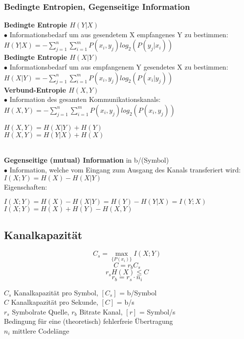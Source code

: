 \subsubsection{Bedingte Entropien, Gegenseitige Information}
	\textbf{Bedingte Entropie $H(Y|X)$}\\
	$\bullet$ Informationsbedarf um aus gesendetem X empfangenes Y zu bestimmen: $H(Y|X)	=- \sum\limits_{j=1}^{n} \sum\limits_{i=1}^{m} P(x_i,y_j) log_2(P(y_j|x_i))$ \\
	\textbf{Bedingte Entropie $H(X|Y)$}\\
	$\bullet$ Informationsbedarf um aus empfangenem Y gesendetes X zu bestimmen: $H(X|Y)	=- \sum\limits_{j=1}^{n} \sum\limits_{i=1}^{m} P(x_i,y_j) log_2(P(x_i|y_j))$ \\
	\textbf{Verbund-Entropie $H(X,Y)$} \\
	$\bullet$ Information des gesamten Kommunikationskanals:  $H(X,Y)	=- \sum\limits_{j=1}^{n} \sum\limits_{i=1}^{m} P(x_i,y_j) log_2(P(x_i,y_j))$ \qquad \parbox{6cm}{
		$H(X,Y) = H(X|Y) + H(Y)$ \\
		$H(X,Y) = H(Y|X) + H(X)$
	} \\
	\textbf{Gegenseitige (mutual) Information} in b/(Symbol)\\
	$\bullet$ Information, welche vom Eingang zum Ausgang des Kanals transferiert wird: $I(X;Y) = H(X)-H(X|Y)$\\
	\hspace*{0.5cm} Eigenschaften: \quad \parbox{12cm}{
	$I(X;Y) = H(X)-H(X|Y) = H(Y)-H(Y|X) = I(Y;X)$ \\
	$I(X;Y) = H(X)+H(Y)-H(X,Y)$}

\subsection{Kanalkapazität }
\begin{minipage}[c]{8cm}
	$$ C_s = \max\limits_{\{ P(x_i) \}}{I (X; Y)} $$
	$$ C = r_b C_s $$
	$$ r_s H(X) \leq C$$
	$$ r_b = r_s \cdot n_i$$
\end{minipage}
\begin{minipage}[c]{10cm}
	$C_s$ Kanalkapazität pro Symbol, $[C_s]$ = b/Symbol \\
	$C$ Kanalkapazität pro Sekunde, $[C]$ = b/s \\
	$r_s$ Symbolrate Quelle, $r_b$ Bitrate Kanal, $[r]$ = Symbol/s \\
	Bedingung für eine (theoretisch) fehlerfreie Übertragung \\
	$n_i$ mittlere Codelänge
\end{minipage}

